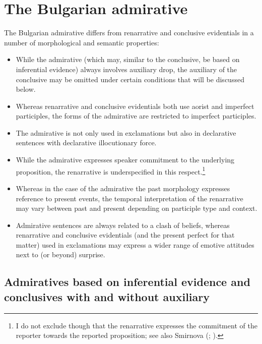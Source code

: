 \documentclass[output=paper,
colorlinks,
citecolor=brown,
newtxmath
]{langscibook}
\begin{document}
\section{The Bulgarian admirative}\label{sec:BG-admirative}

The Bulgarian admirative differs from renarrative and conclusive evidentials in a number of morphological and semantic properties:

\begin{itemize}
    \item While the admirative (which may, similar to the conclusive, be based on inferential evidence) always involves auxiliary drop, the auxiliary of the conclusive may be omitted under certain conditions that will be discussed below.
    \item Whereas renarrative and conclusive evidentials both use aorist and imperfect participles, the forms of the admirative are restricted to imperfect participles.
    \item The admirative is not only used in exclamations but also in declarative sentences with declarative illocutionary force.
    \item While the admirative expresses speaker commitment to the underlying proposition, the renarrative is underspecified in this respect.\footnote{I do not exclude though that the renarrative expresses the commitment of the reporter towards the reported proposition; see also Smirnova (\citeyear{Smirnova2011a}; \citeyear{Smirnova2013}).}
    \item Whereas in the case of the admirative the past morphology expresses reference to present events, the temporal interpretation of the renarrative may vary between past and present depending on participle type and context.
    \item Admirative sentences are always related to a clash of beliefs, whereas renarrative and conclusive evidentials (and the present perfect for that matter) used in exclamations may express a wider range of emotive attitudes next to (or beyond) surprise.
\end{itemize}

\subsection{Admiratives based on inferential evidence and conclusives with and without auxiliary}
\end{document}
